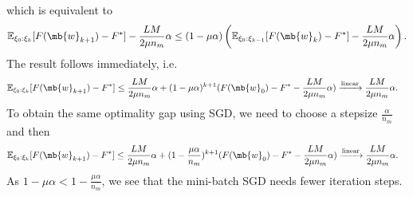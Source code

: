 \begin{exercise}
\begin{enumerate}
\begin{solution}
                which is equivalent to
                \begin{align*}
                    \mathbb{E}_{\xi_0:\xi_{k}}[F(\mb{w}_{k+1})-F^*] - \frac{LM}{2\mu n_m}\alpha \leq (1-\mu\alpha)\left(\mathbb{E}_{\xi_0:\xi_{k-1}}[F(\mb{w}_k)-F^*] - \frac{LM}{2\mu n_m}\alpha\right).
                \end{align*}
                The result follows immediately, i.e.
                \begin{align*}
                    \mathbb{E}_{\xi_0:\xi_k}[F(\mb{w}_{k+1})-F^*] & \leq\frac{LM}{2\mu n_m}\alpha+(1-\mu\alpha)^{k+1}(F(\mb{w}_0)-F^*-\frac{LM}{2\mu n_m}\alpha)
                    \xrightarrow[]{\textup{linear}}\frac{LM}{2\mu n_m}\alpha.
                \end{align*}
                To obtain the same optimality gap using SGD, we need to choose a stepsize $\frac{\alpha}{n_m}$ and then
                \begin{align*}
                    \mathbb{E}_{\xi_0:\xi_k}[F(\mb{w}_{k+1})-F^*] & \leq\frac{LM}{2\mu n_m}\alpha+(1-\frac{\mu\alpha}{n_m})^{k+1}(F(\mb{w}_0)-F^*-\frac{LM}{2\mu n_m}\alpha)
                    \xrightarrow[]{\textup{linear}}\frac{LM}{2\mu n_m}\alpha.
                \end{align*}
                As $1-\mu\alpha < 1-\frac{\mu\alpha}{n_m}$, we see that the mini-batch SGD needs fewer iteration steps.
            \end{solution}



\end{enumerate}
\end{exercise}
